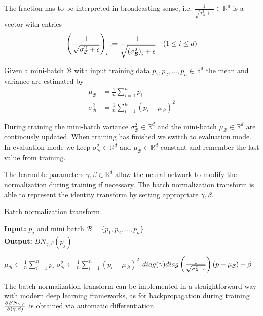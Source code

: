 \documentclass[twoside,a4paper]{article}
\begin{document}
The fraction has to be interpreted in broadcasting sense, i.e.
$\frac{1}{\sqrt{\sigma^2_\mathcal{B} + \epsilon}} \in \mathbb{R}^d$ is a vector with entries
\begin{equation*}
	\left( \frac{1}{\sqrt{\sigma^2_\mathcal{B} + \epsilon}} \right)_i
	:= \frac{1}{ \sqrt{ \left( \sigma^2_\mathcal{B} \right)_i + \epsilon}}
	\quad (1 \leq i \leq d)
\end{equation*}

Given a mini-batch $\mathcal{B}$ with input training data $p_1, p_2, \dots, p_n \in \mathbb{R}^{d}$ the
mean and variance are estimated by
\begin{align*}
	\mu_\mathcal{B} &= \frac{1}{n} \sum_{i=1}^{n} p_i \\
	\sigma^2_\mathcal{B} &= \frac{1}{n} \sum_{i=1}^n (p_i - \mu_\mathcal{B})^2
\end{align*}

During training the mini-batch variance $\sigma^2_\mathcal{B} \in \mathbb{R}^{d}$ and
the mini-batch $\mu_\mathcal{B} \in \mathbb{R}^{d}$ are continously updated.
When training has finished we switch to evaluation mode. In evaluation mode we keep
$\sigma^2_\mathcal{B} \in \mathbb{R}^{d}$ and $\mu_\mathcal{B} \in \mathbb{R}^{d}$ constant
and remember the last value from training.

The learnable parameters $\gamma, \beta \in \mathbb{R}^{d}$ allow the neural network to modify
the normalization during training if necessary. The batch normalization transform is able to 
represent the identity transform by setting appropriate $\gamma, \beta$.

\begin{algorithm}
	\caption{Batch normalization transform}
	\textbf{Input:} $p_j$ and mini batch $\mathcal{B} = \{p_1, p_2, \dots, p_n\}$  \\
	\textbf{Output:} $BN_{\gamma, \beta}(p_j)$
	\begin{algorithmic}
		 
			\State $\mu_\mathcal{B} \gets \frac{1}{n} \sum_{i=1}^{n} p_i$
			\State $\sigma^2_\mathcal{B} \gets \frac{1}{n} \sum_{i=1}^n (p_i - \mu_\mathcal{B})^2$
		\EndIf
		\State \Return 
		$diag(\gamma)diag\left( \frac{1}{\sqrt{\sigma^2_\mathcal{B} + \epsilon}} \right) 
		(p-\mu_\mathcal{B}) + \beta$
	\end{algorithmic}
\end{algorithm}

The batch normalization transform can be implemented in a straightforward way with modern
deep learning frameworks, as for backpropagation during training 
$\frac{\partial BN_{\gamma, \beta}}{\partial (\gamma, \beta)}$ is obtained via automatic differentiation.
\end{document}
